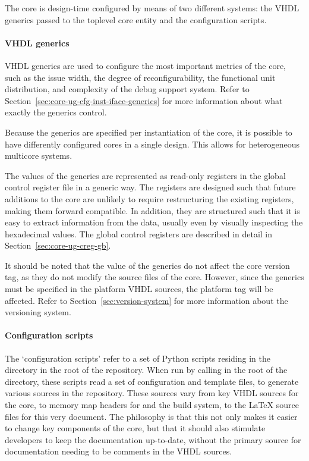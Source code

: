 
\label{sec:core-ug-cfg}

The \rvex{} core is design-time configured by means of two different systems:
the VHDL generics passed to the toplevel core entity and the configuration
scripts.

\paragraph*{VHDL generics} VHDL generics are used to configure the most 
important metrics of the core, such as the issue width, the degree of 
reconfigurability, the functional unit distribution, and complexity of the debug 
support system. Refer to Section~\ref{sec:core-ug-cfg-inst-iface-generics} for 
more information about what exactly the generics control.

Because the generics are specified per instantiation of the core, it is possible
to have differently configured \rvex{} cores in a single design. This allows for
heterogeneous multicore systems.

The values of the generics are represented as read-only registers in the global
control register file in a generic way. The registers are designed such that
future additions to the core are unlikely to require restructuring the existing
registers, making them forward compatible. In addition, they are structured such
that it is easy to extract information from the data, usually even by visually
inspecting the hexadecimal values. The global control registers are described in
detail in Section~\ref{sec:core-ug-creg-gb}.

It should be noted that the value of the generics do not affect the core version
tag, as they do not modify the source files of the core. However, since the
generics must be specified in the platform VHDL sources, the platform tag will
be affected. Refer to Section~\ref{sec:version-system} for more information
about the versioning system. 

\paragraph*{Configuration scripts} The `configuration scripts' refer to a set of 
Python scripts residing in the  directory in the root of the 
\rvex{} repository. When run by calling  in the root of the 
 directory, these scripts read a set of configuration and template 
files, to generate various sources in the repository. These sources vary from 
key VHDL sources for the \rvex{} core, to memory map headers for  and 
the build system, to the LaTeX source files for this very document. The 
philosophy is that this not only makes it easier to change key components of the 
core, but that it should also stimulate developers to keep the documentation 
up-to-date, without the primary source for documentation needing to be comments 
in the VHDL sources.

